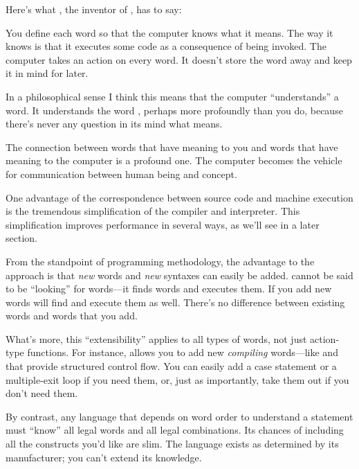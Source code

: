 \begin{interview}
Here's what ,%
the inventor of \Forth{}, has to say:

\begin{tfquot}
You define each word so that the computer knows what it means. The way
it knows is that it executes some code as a consequence of being
invoked. The computer takes an action on every word. It doesn't store
the word away and keep it in mind for later.

In a philosophical sense I think this means that the computer
``understands'' a word. It understands the word , perhaps
more profoundly than you do, because there's never any question in its
mind what  means.

The connection between words that have meaning to you and words that
have meaning to the computer is a profound one. The computer becomes
the vehicle for communication between human being and concept.
\end{tfquot}
\end{interview}
One advantage of the correspondence between source code and machine
execution is the tremendous simplification of the compiler and
interpreter.  This simplification improves performance in several
ways, as we'll see in a later section.

From the standpoint of programming methodology, the advantage to the%
\Forth{} approach is that \emph{new} words and \emph{new} syntaxes can
easily be added. \Forth{} cannot be said to be ``looking'' for words---it
finds words and executes them. If you add new words \Forth{} will find
and execute them as well. There's no difference between existing words
and words that you add.

What's more, this ``extensibility'' applies to all types of words, not
just action-type functions. For instance, \Forth{} allows you to add new
\emph{compiling} words---like  and  that provide
structured control flow. You can easily add a case statement or a
multiple-exit loop if you need them, or, just as importantly, take
them out if you don't need them.

By contrast, any language that depends on word order to understand a
statement must ``know'' all legal words and all legal combinations.
Its chances of including all the constructs you'd like are slim. The
language exists as determined by its manufacturer; you can't extend
its knowledge.

